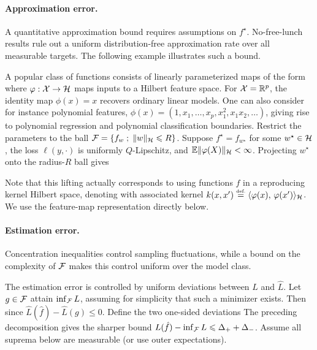 \paragraph{Approximation error.}

A quantitative approximation bound requires assumptions on $f^\star$. No-free-lunch results rule out a uniform distribution-free approximation rate over all measurable targets.
%
The following example illustrates such a bound.

\begin{exmp}
A popular class of functions consists of linearly parameterized maps of the form
where $\varphi : \mathcal{X} \rightarrow \mathcal{H}$ maps inputs to a Hilbert feature space. For $\mathcal{X}=\mathbb{R}^p$, the identity map $\phi(x)=x$ recovers ordinary linear models. One can also consider for instance polynomial features, $\phi(x)=(1, x_1,\ldots,x_p,x_1^2,x_1 x_2, \ldots)$, giving rise to polynomial regression and polynomial classification boundaries.
%
Restrict the parameters to the ball $\mathcal{F} = \left\{ f_w \;;\; \lVert w\rVert_{\mathcal{H}} \leqslant R \right\}$. Suppose $f^\star=f_{w^\star}$ for some $w^\star\in\mathcal{H}$, the loss $\ell(y,\cdot)$ is uniformly $Q$-Lipschitz, and $\mathbb{E}\lVert\varphi(X)\rVert_{\mathcal{H}}<\infty$. Projecting $w^\star$ onto the radius-$R$ ball gives
\end{exmp}

\begin{rem}
Note that this lifting actually corresponds to using functions $f$ in a reproducing kernel Hilbert space, denoting
with associated kernel $k(x,x') \stackrel{\mbox{\upshape\tiny def.}}{=} \langle \varphi(x),\,\varphi(x')\rangle_{\mathcal{H}}$. We use the feature-map representation directly below.
\end{rem}


\paragraph{Estimation error.}

Concentration inequalities control sampling fluctuations, while a bound on the complexity of $\mathcal{F}$ makes this control uniform over the model class.

The estimation error is controlled by uniform deviations between $L$ and $\hat L$. Let $g\in\mathcal{F}$ attain $\inf_{\mathcal{F}}L$, assuming for simplicity that such a minimizer exists. Then
since $\hat L(\hat f) - \hat L(g) \leq 0$.
%
Define the two one-sided deviations
The preceding decomposition gives the sharper bound $L(\hat f)-\inf_{\mathcal{F}} L\leqslant\Delta_++\Delta_-$. Assume all suprema below are measurable (or use outer expectations).

